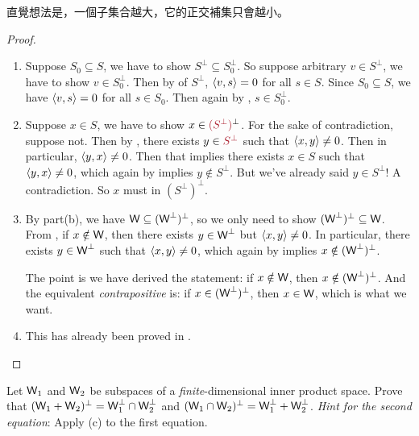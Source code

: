 \begin{note}
直覺想法是，一個子集合越大，它的正交補集只會越小。
\end{note}

\begin{proof} \ 

\begin{enumerate}
\item Suppose \(S_0 \subseteq S\), we have to show \(S^{\perp} \subseteq S_0^{\perp}\).
So suppose arbitrary \(v \in S^{\perp}\), we have to show \(v \in S_0^{\perp}\).
Then by  of \(S^{\perp}\), \(\left< v, s \right> = 0\) for all \(s \in S\).
Since \(S_0 \subseteq S\), we have \(\left< v, s \right> = 0\) for all \(s \in S_0\).
Then again by , \(s \in S_0^{\perp}\).

\item Suppose \(x \in S\), we have to show \(x \in \MAROON{(S^{\perp})}^{\perp}\).
For the sake of contradiction, suppose not.
Then by , there exists \(y \in \MAROON{S^{\perp}}\) such that \(\left< x, y \right> \ne 0\).
Then in particular, \(\left< y, x \right> \ne 0\).
Then that implies there exists \(x \in S\) such that \(\left< y, x \right> \ne 0\), which again by  implies \(y \notin S^{\perp}\).
But we've already said \(y \in S^{\perp}\)! A contradiction.
So \(x\) must in \((S^{\perp})^{\perp}\).

\item By part(b), we have \(\textsf{W} \subseteq (\textsf{W}^{\perp})^{\perp}\), so we only need to show \((\textsf{W}^{\perp})^{\perp} \subseteq \textsf{W}\).
From , if \(x \notin \textsf{W}\), then there exists \(y \in \textsf{W}^{\perp}\) but \(\left< x, y \right> \ne 0\).
In particular, there exists \(y \in \textsf{W}^{\perp}\) such that \(\left< x, y \right> \ne 0\), which again by  implies \(x \notin (\textsf{W}^{\perp})^{\perp}\).

The point is we have derived the statement: if \(x \notin \textsf{W}\), then \(x \notin (\textsf{W}^{\perp})^{\perp}\).
And the equivalent \emph{contrapositive} is: if \(x \in (\textsf{W}^{\perp})^{\perp}\), then \(x \in \textsf{W}\), which is what we want.

\item This has already been proved in .
\end{enumerate}
\end{proof}

\begin{exercise} \label{exercise 6.2.14}
Let \(\textsf{W}_1\) and \(\textsf{W}_2\) be subspaces of a \emph{finite}-dimensional inner product space.
Prove that \((\textsf{W}_1 + \textsf{W}_2)^{\perp} = \textsf{W}_1^{\perp} \cap \textsf{W}_2^{\perp}\) and \((\textsf{W}_1 \cap \textsf{W}_2)^{\perp} = \textsf{W}_1^{\perp} + \textsf{W}_2^{\perp}\).
\emph{Hint for the second equation}: Apply (c) to the first equation.
\end{exercise}

